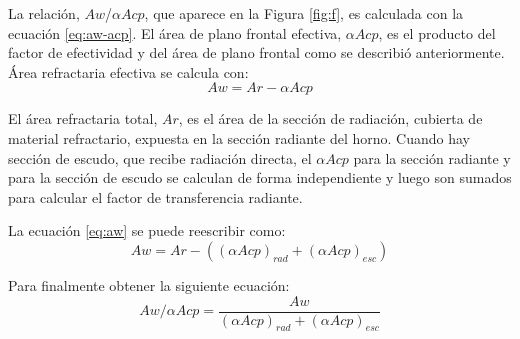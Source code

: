 \par La relación, $Aw$/$\alpha Acp$, que aparece en la Figura \ref{fig:f}, es calculada con la ecuación \ref{eq:aw-acp}. El área de plano frontal efectiva, $\alpha Acp$, es el producto del factor de efectividad y del área de plano frontal como se describió anteriormente. Área refractaria efectiva se calcula con:
\begin{equation} \label{eq:aw}
Aw = Ar - \alpha Acp
\end{equation}
\par El área refractaria total, $Ar$, es el área de la sección de radiación, cubierta de material refractario, expuesta en la sección radiante del horno. Cuando hay sección de escudo, que recibe radiación directa, el $\alpha Acp$ para la sección radiante y para la sección de escudo se calculan de forma independiente y luego son sumados para calcular el factor de transferencia radiante.
\par La ecuación \ref{eq:aw} se puede reescribir como:
\begin{equation}
Aw = Ar - ((\alpha Acp)_{rad} + (\alpha Acp)_{esc})   
\end{equation}
\par Para finalmente obtener la siguiente ecuación:
\begin{equation} \label{eq:aw-acp}
Aw/\alpha Acp = \frac{Aw}{(\alpha Acp)_{rad} + (\alpha Acp)_{esc}}
\end{equation}

